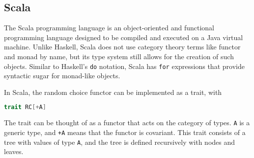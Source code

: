 %

\subsection{Scala}

The Scala programming language is an object-oriented and functional programming language designed to be compiled and executed on a Java virtual machine.  Unlike Haskell, Scala does not  use category theory terms like functor and monad by name, but its type system still allows for the creation of such objects.  Similar to Haskell's \texttt{do} notation, Scala has \texttt{for} expressions that provide syntactic sugar for monad-like objects.

In Scala, the random choice functor can be implemented as a trait, with 
\begin{lstlisting}[language=Scala]
trait RC[+A]
\end{lstlisting}
The trait can be thought of as a functor that acts on the category of types.  \texttt{A} is a generic type, and \texttt{+A} means that the functor is covariant.  This trait consists of a tree with values of type \texttt{A}, and the tree is defined recursively with nodes and leaves.  

